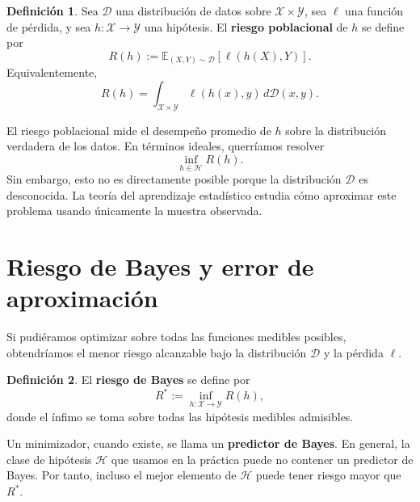 \documentclass[11pt]{report}
\newenvironment{tcolorbox}[1][]{\par\medskip\noindent\ignorespaces}{\par\medskip}
\theoremstyle{definition}
\newtheorem{definicion}{Definición}[section]
\theoremstyle{plain}
\numberwithin{equation}{section}
\begin{document}
\begin{tcolorbox}[colback=blue!8, colframe=blue!8, boxrule=0pt]
\begin{definicion}
Sea \(\mathcal{D}\) una distribución de datos sobre \(\mathcal{X}\times\mathcal{Y}\), sea \(\ell\) una función de pérdida, y sea \(h:\mathcal{X}\to\mathcal{Y}\) una hipótesis. El \textbf{riesgo poblacional} de \(h\) se define por
\begin{equation*}
    R(h)
    :=
    \mathbb{E}_{(X,Y)\sim\mathcal{D}}
    [\ell(h(X),Y)].
\end{equation*}
Equivalentemente,
\begin{equation*}
    R(h)
    =
    \int_{\mathcal{X}\times\mathcal{Y}}
    \ell(h(x),y)\,d\mathcal{D}(x,y).
\end{equation*}
\end{definicion}
\end{tcolorbox}

El riesgo poblacional mide el desempeño promedio de \(h\) sobre la distribución verdadera de los datos. En términos ideales, querríamos resolver
\begin{equation*}
    \inf_{h\in\mathcal{H}} R(h).
\end{equation*}
Sin embargo, esto no es directamente posible porque la distribución \(\mathcal{D}\) es desconocida. La teoría del aprendizaje estadístico estudia cómo aproximar este problema usando únicamente la muestra observada.

\section{Riesgo de Bayes y error de aproximación}

Si pudiéramos optimizar sobre todas las funciones medibles posibles, obtendríamos el menor riesgo alcanzable bajo la distribución \(\mathcal{D}\) y la pérdida \(\ell\).

\begin{tcolorbox}[colback=blue!8, colframe=blue!8, boxrule=0pt]
\begin{definicion}
El \textbf{riesgo de Bayes} se define por
\begin{equation*}
    R^*
    :=
    \inf_{h:\mathcal{X}\to\mathcal{Y}}
    R(h),
\end{equation*}
donde el ínfimo se toma sobre todas las hipótesis medibles admisibles.
\end{definicion}
\end{tcolorbox}

Un minimizador, cuando existe, se llama un \textbf{predictor de Bayes}. En general, la clase de hipótesis \(\mathcal{H}\) que usamos en la práctica puede no contener un predictor de Bayes. Por tanto, incluso el mejor elemento de \(\mathcal{H}\) puede tener riesgo mayor que \(R^*\).
\end{document}
